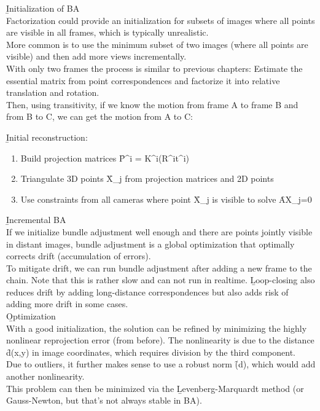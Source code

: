 \b{Initialization of BA\\[.5em]}
Factorization could provide an initialization for subsets of images where all points are visible in all frames, which is typically unrealistic.\\
More common is to use the minimum subset of two images (where all points are visible) and then add more views incrementally.\\

With only two frames the process is similar to previous chapters: Estimate the essential matrix from point correspondences and factorize it into relative translation and rotation.\\
Then, using transitivity, if we know the motion from frame A to frame B and from B to C, we can get the motion from A to C:

\b{Initial reconstruction:}
\begin{enumerate}
    \item Build projection matrices \f{P^i = K^i(R^it^i)}
    \item Triangulate 3D points \f{X_j} from projection matrices and 2D points
    \item Use constraints from all cameras where point \f{X_j} is visible to solve \f{AX_j=0}
\end{enumerate}
\newpage
\b{Incremental BA\\[.5em]}
If we initialize bundle adjustment well enough and there are points jointly visible in distant images, bundle adjustment is a global optimization that optimally corrects drift (accumulation of errors).\\

To mitigate drift, we can run bundle adjustment after adding a new frame to the chain. Note that this is rather slow and can not run in realtime. \b{Loop-closing} also reduces drift by adding long-distance correspondences but also adds risk of adding more drift in some cases.\\

\b{Optimization\\[.5em]}
With a good initialization, the solution can be refined by minimizing the highly nonlinear reprojection error (from before). The nonlinearity is due to the distance \f{d(x,y)} in image coordinates, which requires division by the third component.\\
Due to outliers, it further makes sense to use a robust norm \f{\Psi(d)}, which would add another nonlinearity.\\
This problem can then be minimized via the \b{Levenberg-Marquardt} method (or Gauss-Newton, but that's not always stable in BA). \\

